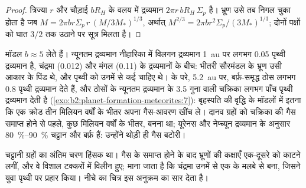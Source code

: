 \begin{proof}
त्रिज्या $r$ और चौड़ाई $bR_H$ के वलय में द्रव्यमान
$2\pi r\, bR_H\,\Sigma_p$ है। भ्रूण उसे तब निगल चुका होता है जब
$M = 2\pi b r\Sigma_p\, r\,(M/3M_*)^{1/3}$, अर्थात्
$M^{2/3} = 2\pi b r^2\Sigma_p/(3M_*)^{1/3}$; दोनों पक्षों को घात
$3/2$ तक उठाने पर सूत्र मिलता है।
\end{proof}

मॉडल $b \approx 5$ लेते हैं। न्यूनतम द्रव्यमान नीहारिका में विलगन द्रव्यमान
\qty{1}{au} पर लगभग \num{0.05} पृथ्वी द्रव्यमान है, चंद्रमा (\num{0.012}) और
मंगल (\num{0.11}) के द्रव्यमानों के बीच: भीतरी सौरमंडल के भ्रूण
उसी आकार के पिंड थे, और पृथ्वी को उनमें से कई चाहिए थे।  के परे, \qty{5.2}{au} पर, बर्फ़-समृद्ध ठोस लगभग
\num{0.8} पृथ्वी द्रव्यमान देते हैं, और ठोसों के न्यूनतम द्रव्यमान के \num{3.5} गुना वाली
चक्रिका लगभग पाँच पृथ्वी द्रव्यमान देती है (\cref{exo:b2:planet-formation-meteorites:7}): बृहस्पति की वृद्धि के
मॉडलों में इतना कि एक क्रोड तीन मिलियन वर्षों के भीतर अपना गैस-आवरण खींच ले।
दानव ग्रहों को चक्रिका की गैस समाप्त होने से पहले, कुछ मिलियन
वर्षों के भीतर, बनना था; यूरेनस और नेप्च्यून द्रव्यमान के अनुसार \qtyrange{80}{90}{\percent} चट्टान और बर्फ़
हैं: उन्होंने थोड़ी ही गैस बटोरी।

चट्टानी ग्रहों का अंतिम चरण हिंसक था। गैस के समाप्त होने के बाद
भ्रूणों की कक्षाएँ एक-दूसरे को काटने लगीं, और वे विशाल टक्करों में विलीन हुए; माना जाता है कि
चंद्रमा उनमें से एक के मलबे से बना, जिसने युवा
पृथ्वी पर प्रहार किया। नीचे का चित्र इस अनुक्रम का सार देता है।

